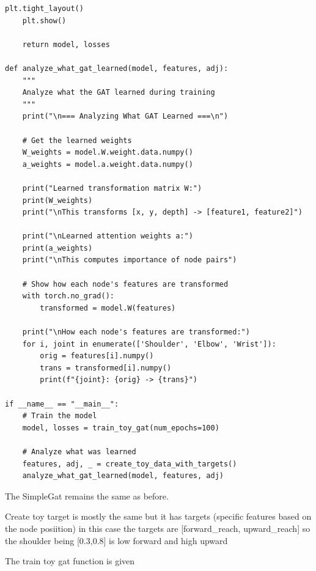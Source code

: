\begin{lstlisting}[style=pythonstyle,title={Toy problem with fake training},label={code:toy_problem_with_fake_training}]
    plt.tight_layout()
    plt.show()
    
    return model, losses

def analyze_what_gat_learned(model, features, adj):
    """
    Analyze what the GAT learned during training
    """
    print("\n=== Analyzing What GAT Learned ===\n")
    
    # Get the learned weights
    W_weights = model.W.weight.data.numpy()
    a_weights = model.a.weight.data.numpy()
    
    print("Learned transformation matrix W:")
    print(W_weights)
    print("\nThis transforms [x, y, depth] -> [feature1, feature2]")
    
    print("\nLearned attention weights a:")
    print(a_weights)
    print("\nThis computes importance of node pairs")
    
    # Show how each node's features are transformed
    with torch.no_grad():
        transformed = model.W(features)
        
    print("\nHow each node's features are transformed:")
    for i, joint in enumerate(['Shoulder', 'Elbow', 'Wrist']):
        orig = features[i].numpy()
        trans = transformed[i].numpy()
        print(f"{joint}: {orig} -> {trans}")

if __name__ == "__main__":
    # Train the model
    model, losses = train_toy_gat(num_epochs=100)
    
    # Analyze what was learned
    features, adj, _ = create_toy_data_with_targets()
    analyze_what_gat_learned(model, features, adj)
\end{lstlisting}

The SimpleGat remains the same as before.

Create toy target is mostly the same but it has targets (specific features
based on the node posiition) in this case the targets are [forward\_reach,
upward\_reach] so the shoulder being [0.3,0.8] is low forward and high upward

The train toy gat function is given 

